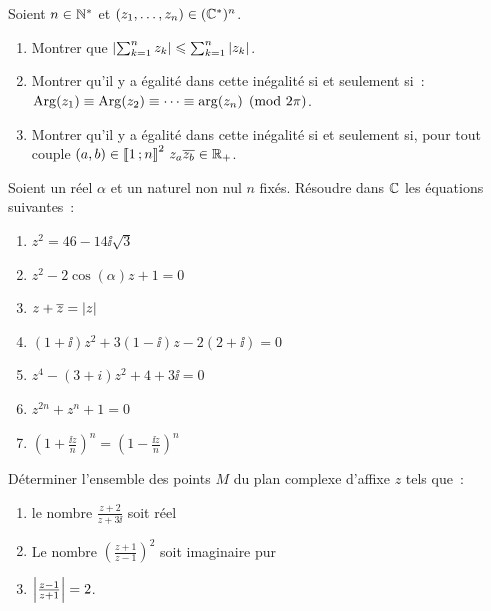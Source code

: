 \begin{exercice}
  Soient \(n \in \mathbb{N}^{*}\) et \((z_1, \ldots, z_n) \in (\mathbb{C}^{*})^n\).
  \begin{enumerate}
    \item Montrer que \( \left\lvert\sum_{k = 1}^n z_k\right\rvert \leqslant \sum_{k = 1}^n 
      \left\lvert z_k\right\rvert\).
    \item Montrer qu'il y a égalité dans cette inégalité si et seulement 
      si~: \(\operatorname{Arg}(z_1) \equiv \operatorname{Arg}(z_2) \equiv \cdots \equiv \arg(z_n) 
      \pmod{2\pi}\).
    \item Montrer qu'il y a égalité dans cette inégalité si et seulement si, 
      pour tout couple \((a,b) \in \mathopen{\llbracket}1\mathclose{}\mathpunct{};n\mathclose{\rrbracket}^2 \ z_a 
      \overline{z_b} \in \mathbb{R}_{+}\).
  \end{enumerate}
\end{exercice}

\begin{exercice}
  Soient un réel \(\alpha\) et un naturel non nul \(n\) fixés. Résoudre dans 
  \(\mathbb{C}\) les équations suivantes~:
  \begin{multicols}{2}
    \begin{enumerate}
      \item \(z^2 = 46-14\ii\sqrt{3}\)
      \item \(z^2-2\cos(\alpha)z + 1 = 0\)
      \item \(z + \overline{z} = \left\lvert z\right\rvert\)
      \item \((1 + \ii)z^2 + 3(1-\ii)z-2(2 + \ii) = 0\)
      \item \(z^4-(3 + i)z^2 + 4 + 3\ii = 0\)
      \item \(z^{2n} + z^n + 1 = 0\)
      \item \(\left( 1 + \frac{\ii z}{n} \right)^n = \left( 1-\frac{\ii 
        z}{n} \right)^n\)
    \end{enumerate}
  \end{multicols}
\end{exercice}

\begin{exercice}
  Déterminer l'ensemble des points \(M\) du plan complexe d'affixe \(z\) tels 
  que~:
  \begin{enumerate}
    \item le nombre \(\frac{z + 2}{z + 3\ii}\) soit réel
    \item Le nombre \(\left( \frac{z + 1}{z-1} \right)^2\) soit imaginaire 
      pur
    \item \(\left\lvert\frac{z-1}{z + 1}\right\rvert = 2\).
  \end{enumerate}
\end{exercice}

